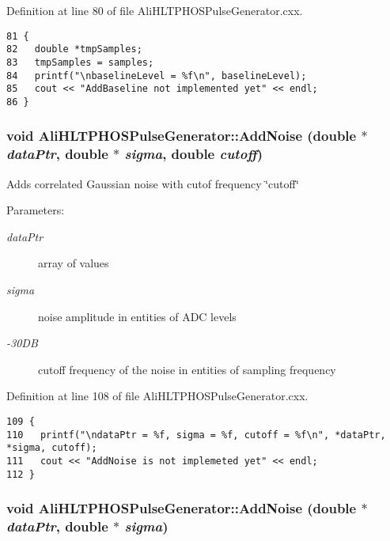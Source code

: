 Definition at line 80 of file Ali\-HLTPHOSPulse\-Generator.cxx.

\footnotesize\begin{verbatim}81 {
82   double *tmpSamples;
83   tmpSamples = samples;
84   printf("\nbaselineLevel = %f\n", baselineLevel);
85   cout << "AddBaseline not implemented yet" << endl;
86 }
\end{verbatim}\normalsize 


\subsubsection{\setlength{\rightskip}{0pt plus 5cm}void Ali\-HLTPHOSPulse\-Generator::Add\-Noise (double $\ast$ {\em data\-Ptr}, double $\ast$ {\em sigma}, double {\em cutoff})}\label{classAliHLTPHOSPulseGenerator_AliHLTPHOSPulseGeneratora7}


Adds correlated Gaussian noise with cutof frequency \char`\"{}cutoff\char`\"{} \begin{Desc}
\item[Parameters:]
\begin{description}
\item[{\em data\-Ptr}]array of values \item[{\em sigma}]noise amplitude in entities of ADC levels \item[{\em -30DB}]cutoff frequency of the noise in entities of sampling frequency \end{description}
\end{Desc}


Definition at line 108 of file Ali\-HLTPHOSPulse\-Generator.cxx.

\footnotesize\begin{verbatim}109 {
110   printf("\ndataPtr = %f, sigma = %f, cutoff = %f\n", *dataPtr, *sigma, cutoff);
111   cout << "AddNoise is not implemeted yet" << endl;
112 }
\end{verbatim}\normalsize 


\subsubsection{\setlength{\rightskip}{0pt plus 5cm}void Ali\-HLTPHOSPulse\-Generator::Add\-Noise (double $\ast$ {\em data\-Ptr}, double $\ast$ {\em sigma})}\label{classAliHLTPHOSPulseGenerator_AliHLTPHOSPulseGeneratora6}


